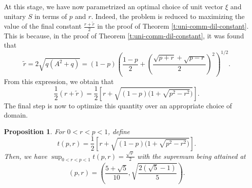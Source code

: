 \documentclass[10pt]{amsart}
\renewcommand{\phi}{\varphi}
\newtheorem{proposition}[theorem]{Proposition}
\begin{document}
At this stage, we have now parametrized an optimal choice of unit vector $\xi$ and unitary $S$ in terms of $p$ and $r$. Indeed, the problem is reduced to maximizing the value of the final constant $\frac{r+\widetilde{r}}{2}$ in the proof of Theorem \ref{t:uni-comm-dil-constant}. This is because, in the proof of Theorem \ref{t:uni-comm-dil-constant}, it was found that
\[
    \widetilde{r} =  2\sqrt{q\left(A^2 + q \right)} = (1-p)\left(\frac{1-p}{2} + \left( \frac{\sqrt{p+r}+\sqrt{p-r}}{2} \right)^2 \right)^{1/2}.
\]
From this expression, we obtain that
\[
    \frac{1}{2}(r+\widetilde{r}) = \frac{1}{2}\left[r+\sqrt{(1-p)\bigl(1+\sqrt{p^2-r^2}\bigr)}\right].
\]
The final step is now to optimize this quantity over an appropriate choice of domain.

\begin{proposition}\label{p:optimize-3}
    For $0<r<p<1$, define
    \[
        t(p,r)=\frac{1}{2}\left[r+\sqrt{(1-p)\bigl(1+\sqrt{p^2-r^2}\bigr)}\right].
    \]
    Then, we have $\sup_{0<r<p<1} t(p,r)=\frac{\sqrt\phi}{2}$ with the supremum being attained at
    \[
        (p,r) =\left(\frac{5+\sqrt5}{10}, \sqrt{\frac{2(\sqrt5-1)}{5}}\right).
    \]
\end{proposition}
\end{document}
